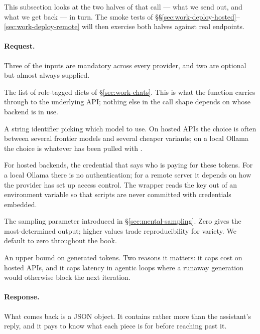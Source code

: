 \noindent
This subsection looks at the two halves of that call --- what we
send out, and what we get back --- in turn. The smoke tests of
\S\S\ref{sec:work-deploy-hosted}--\ref{sec:work-deploy-remote}
will then exercise both halves against real endpoints.

\paragraph{Request.}
Three of the inputs are mandatory across every provider, and two
are optional but almost always supplied.

\begin{description}[style=nextline,leftmargin=1.5em,itemsep=0.3em]
\item[\code{messages}] The list of role-tagged dicts of
  \S\ref{sec:work-chats}. This is what the function carries
  through to the underlying API; nothing else in the call shape
  depends on whose backend is in use.
\item[\code{model}] A string identifier picking which model to
  use. On hosted APIs the choice is often between several
  frontier models and several cheaper variants; on a local Ollama
  the choice is whatever has been pulled with .
\item[An API key.] For hosted backends, the credential that says
  who is paying for these tokens. For a local Ollama there is no
  authentication; for a remote server it depends on how the
  provider has set up access control. The wrapper reads the key
  out of an environment variable so that scripts are never
  committed with credentials embedded.
\item[\code{temperature}] The sampling parameter introduced in
  \S\ref{sec:mental-sampling}. Zero gives the most-determined
  output; higher values trade reproducibility for variety. We
  default to zero throughout the book.
\item[\code{max\_tokens}] An upper bound on generated tokens. Two
  reasons it matters: it caps cost on hosted APIs, and it caps
  latency in agentic loops where a runaway generation would
  otherwise block the next iteration.
\end{description}

\paragraph{Response.}
What comes back is a JSON object. It contains rather more than the
assistant's reply, and it pays to know what each piece is for
before reaching past it.

